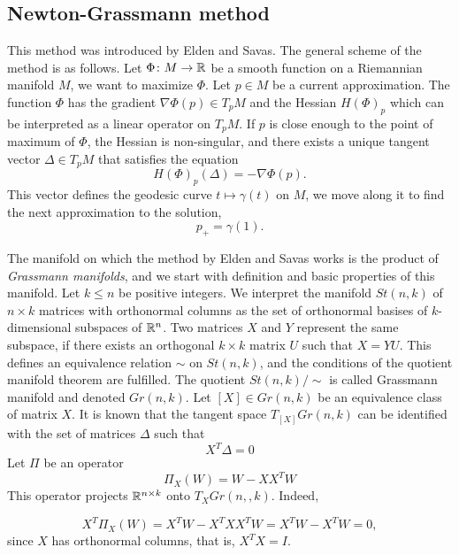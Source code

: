 \subsection{Newton-Grassmann method}

This method was introduced by Elden and Savas. 
The general scheme of the method is as follows.
Let $\Phi \colon M \to \mathbb{R}$ be a smooth function 
on a Riemannian manifold $M$, we want to maximize $\Phi$.
Let $p \in M$
be a current approximation. The function $\Phi$ has the gradient 
$\nabla \Phi (p) \in T_pM$ and the Hessian $H(\Phi)_p$
which can be interpreted as a linear operator on $T_pM$.
If $p$ is close enough to the point of maximum of $\Phi$,
the Hessian is non-singular, and there exists a unique tangent vector 
$\Delta \in T_pM$ that satisfies the equation
\begin{equation}
    \label{NewgrGeneral}
    H(\Phi)_p(\Delta) = - \nabla \Phi(p).
\end{equation}
This vector defines the geodesic curve $t \mapsto \gamma(t)$ on $M$,
we move along it to find the next approximation to the solution,
\begin{equation}
p_{+} = \gamma(1).
\end{equation}


The manifold on which the method by Elden and Savas works is the product
of \textit{Grassmann manifolds}, and we start with definition and basic properties
of this manifold.  Let $k \leq n$ be positive integers. We interpret the manifold $St(n, k)$
of $n \times k$ matrices with orthonormal columns
as the set of orthonormal basises of $k$-dimensional subspaces
of $\mathbb{R}^n$. Two matrices $X$ and $Y$ represent the same subspace,
if there exists an orthogonal $k \times k$ matrix $U$ such that
$X = YU$. This defines an equivalence relation $\sim$ on $St(n, k)$, and the conditions
of the quotient manifold theorem are fulfilled. The quotient $St(n, k)/ \sim$ is called
Grassmann manifold and denoted $Gr(n, k)$.
Let $[X] \in Gr(n,k)$ be an equivalence class of matrix $X$.
It is known that the tangent
space $T_{[X]}Gr(n, k)$ can be identified with the set of matrices $\Delta$
such that 
\begin{equation}
    X^T \Delta = 0
\end{equation}
Let $\Pi$ be an operator
\begin{equation}
    \Pi_X(W) = W - XX^TW
\end{equation}
This operator projects $\mathbb{R}^{n \times k}$ onto $T_XGr(n, ,k)$. Indeed,

\begin{equation}
    X^T \Pi_X(W) = X^T W - X^TXX^T W = X^TW - X^TW = 0,
\end{equation}
since $X$ has orthonormal columns, that is, $X^TX = I$.


